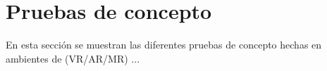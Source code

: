 \section{Pruebas de concepto}
\label{seccion-pruebas-concepto}

En esta sección se muestran las diferentes pruebas de concepto hechas en ambientes de (VR/AR/MR) ...